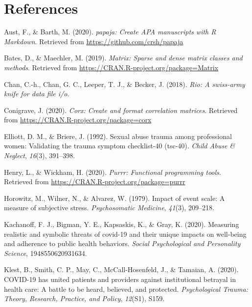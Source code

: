 \documentclass[
  english,
  man, noextraspace]{apa6}
\begin{document}
\newpage

\hypertarget{references}{%
\section{References}\label{references}}

\begingroup
\setlength{\parindent}{-0.5in}
\setlength{\leftskip}{0.5in}

\hypertarget{refs}{}
\leavevmode\hypertarget{ref-R-papaja}{}%
Aust, F., \& Barth, M. (2020). \emph{papaja: Create APA manuscripts with R Markdown}. Retrieved from \url{https://github.com/crsh/papaja}

\leavevmode\hypertarget{ref-R-Matrix}{}%
Bates, D., \& Maechler, M. (2019). \emph{Matrix: Sparse and dense matrix classes and methods}. Retrieved from \url{https://CRAN.R-project.org/package=Matrix}

\leavevmode\hypertarget{ref-R-rio}{}%
Chan, C.-h., Chan, G. C., Leeper, T. J., \& Becker, J. (2018). \emph{Rio: A swiss-army knife for data file i/o}.

\leavevmode\hypertarget{ref-R-corx}{}%
Conigrave, J. (2020). \emph{Corx: Create and format correlation matrices}. Retrieved from \url{https://CRAN.R-project.org/package=corx}

\leavevmode\hypertarget{ref-elliott1992}{}%
Elliott, D. M., \& Briere, J. (1992). Sexual abuse trauma among professional women: Validating the trauma symptom checklist-40 (tsc-40). \emph{Child Abuse \& Neglect}, \emph{16}(3), 391--398.

\leavevmode\hypertarget{ref-R-purrr}{}%
Henry, L., \& Wickham, H. (2020). \emph{Purrr: Functional programming tools}. Retrieved from \url{https://CRAN.R-project.org/package=purrr}

\leavevmode\hypertarget{ref-horowitz1979}{}%
Horowitz, M., Wilner, N., \& Alvarez, W. (1979). Impact of event scale: A measure of subjective stress. \emph{Psychosomatic Medicine}, \emph{41}(3), 209--218.

\leavevmode\hypertarget{ref-kachanoff2020}{}%
Kachanoff, F. J., Bigman, Y. E., Kapsaskis, K., \& Gray, K. (2020). Measuring realistic and symbolic threats of covid-19 and their unique impacts on well-being and adherence to public health behaviors. \emph{Social Psychological and Personality Science}, 1948550620931634.

\leavevmode\hypertarget{ref-klest2020}{}%
Klest, B., Smith, C. P., May, C., McCall-Hosenfeld, J., \& Tamaian, A. (2020). COVID-19 has united patients and providers against institutional betrayal in health care: A battle to be heard, believed, and protected. \emph{Psychological Trauma: Theory, Research, Practice, and Policy}, \emph{12}(S1), S159.
\end{document}

